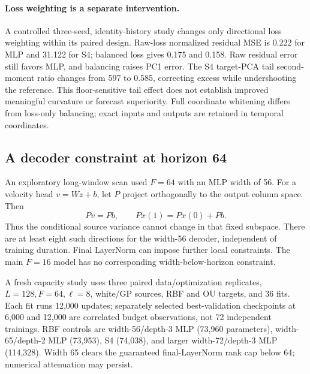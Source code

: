 \documentclass[10pt,twocolumn]{article}
\begin{document}
\paragraph{Loss weighting is a separate intervention.}
A controlled three-seed, identity-history study changes only directional loss weighting within its paired design. Raw-loss normalized residual MSE is 0.222 for MLP and 31.122 for S4; balanced loss gives 0.175 and 0.158. Raw residual error still favors MLP, and balancing raises PC1 error. The S4 target-PCA tail second-moment ratio changes from 597 to 0.585, correcting excess while undershooting the reference. This floor-sensitive tail effect does not establish improved meaningful curvature or forecast superiority. Full coordinate whitening differs from loss-only balancing; exact inputs and outputs are retained in temporal coordinates.

\subsection{A decoder constraint at horizon 64}
An exploratory long-window scan used $F=64$ with an MLP width of 56. For a velocity head $v=Wz+b$, let $P$ project orthogonally to the output column space. Then
\begin{equation}
 Pv=Pb,\qquad Px(1)=Px(0)+Pb.
\end{equation}
Thus the conditional source variance cannot change in that fixed subspace. There are at least eight such directions for the width-56 decoder, independent of training duration. Final LayerNorm can impose further local constraints. The main $F=16$ model has no corresponding width-below-horizon constraint.

A fresh capacity study uses three paired data/optimization replicates, $L=128,F=64,\ell=8$, white/GP sources, RBF and OU targets, and 36 fits. Each fit runs 12,000 updates; separately selected best-validation checkpoints at 6,000 and 12,000 are correlated budget observations, not 72 independent trainings. RBF controls are width-56/depth-3 MLP (73,960 parameters), width-65/depth-2 MLP (73,953), S4 (74,038), and larger width-72/depth-3 MLP (114,328). Width 65 clears the guaranteed final-LayerNorm rank cap below 64; numerical attenuation may persist.
\begin{table}[h]
\centering\small
\caption{RBF capacity study at the 12,000-update budget; means over three fresh paired draws. Width/depth and larger-capacity controls have distinct interpretations.}\label{tab:capacity}
\end{table}
\end{document}

